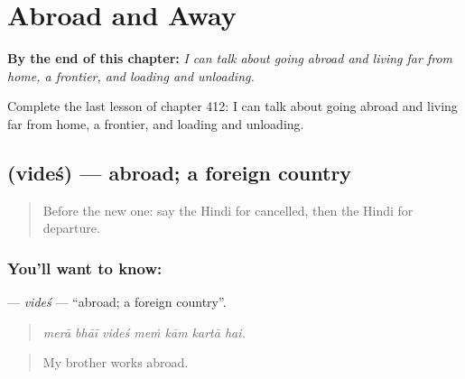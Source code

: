 
\chapter{Abroad and Away}
\label{ch:hi-abroad-and-away}

\begin{chapteropening}
\textbf{By the end of this chapter:} \emph{I can talk about going abroad and living far from home, a frontier, and loading and unloading.}

Complete the last lesson of chapter 412: I can talk about going abroad and living far from home, a frontier, and loading and unloading.
\end{chapteropening}

\section[\texorpdfstring{\hi{विदेश} (videś)}{विदेश (videś)}]{ (videś) — abroad; a foreign country}

\label{lesson:HI-C412-vides}



\begin{quote}
Before the new one: say the Hindi for cancelled, then the Hindi for departure.
\end{quote}

\subsection*{You'll want to know: }
\textbf{} — \emph{videś} — \textquotedblleft{}abroad; a foreign country\textquotedblright{}.

\begin{quote}
      
\end{quote}

\begin{quote}
\emph{merā bhāī videś meṁ kām kartā hai.}
\end{quote}

\begin{quote}
My brother works abroad.
\end{quote}


